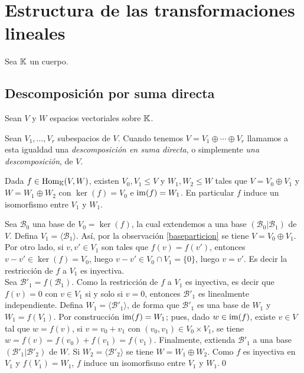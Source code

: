 \chapter{Estructura de las transformaciones lineales}

Sea $\mathbb{K}$ un cuerpo.

\section{Descomposici\'on por suma directa}

Sean $V$ y $W$ espacios vectoriales sobre $\mathbb{K}$.

\begin{defn}
  Sean $V_1,\ldots,V_r$ subespacios de $V$. Cuando tenemos $V=V_1\oplus\cdots\oplus V_r$ llamamos a esta igualdad una \emph{descomposición en suma directa}, o simplemente \emph{una descomposición}, de $V$.
\end{defn}

\begin{teo}\label{descomposicionsumadirecta}
Dada $f\in\operatorname{Hom}_{\mathbb{K}}(V,W)$, existen $V_0,V_1\le V$ y $W_1,W_2\le W$ tales que $V=V_0\oplus V_1$ y $W=W_1\oplus W_2$ con $\ker(f)=V_0$ e $\operatorname{im}(f)=W_1$. En particular $f$ induce un isomorfismo entre $V_1$ y $W_1$.
\end{teo}

\dem Sea $\mathcal{B}_0$ una base de $V_0=\ker(f)$, la cual extendemos a una base $\left(\mathcal{B}_0| \mathcal{B}_1\right)$ de $V$. Defina $V_1=\langle \mathcal{B}_1\rangle$. As\'i, por la observación \ref{baseparticion} se tiene $V=V_0\oplus V_1$. Por otro lado, si $v,v'\in V_1$ son tales que $f(v)=f(v')$, entonces $v-v'\in \ker(f)=V_0$, luego $v-v'\in V_0\cap V_1=\{0\}$, luego $v=v'$. Es decir la restricci\'on de $f$ a $V_1$ es inyectiva.\\
Sea $\mathcal{B}'_1=f(\mathcal{B}_1)$. Como la restricción de $f$ a $V_1$ es inyectiva, es decir que $f(v)=0$ con $v\in V_1$ si y solo si $v=0$, entonces $\mathcal{B}'_1$ es linealmente independiente. Defina $W_1=\langle \mathcal{B}'_1\rangle$, de forma que $\mathcal{B}'_1$ es una base de $W_1$ y $W_1=f(V_1)$. Por construcci\'on $\operatorname{im}(f)=W_1$; pues, dado $w\in\operatorname{im}(f)$, existe $v\in V$ tal que $w=f(v)$, si $v=v_0+v_1$ con $(v_0,v_1)\in V_0\times V_1$, se tiene $w=f(v)=f(v_0)+f(v_1)=f(v_1)$. Finalmente, extienda $\mathcal{B}'_1$ a una base $\left(\mathcal{B}'_1| \mathcal{B}'_2\right)$ de $W$. Si $W_2=\langle \mathcal{B}'_2\rangle$ se tiene $W=W_1\oplus W_2$. Como $f$ es inyectiva en $V_1$ y $f(V_1)=W_1$, $f$ induce un isomorfismo entre $V_1$ y $W_1$.\qed


